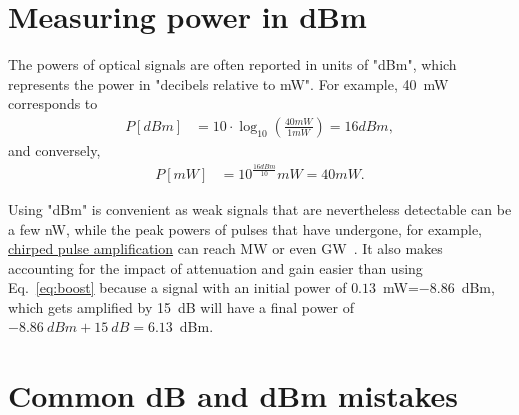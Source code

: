 \section{Measuring power in dBm}
The powers of optical signals are often reported in units of "dBm", which represents the power in "decibels relative to mW". For example, 40~mW corresponds to
\begin{align}
    P [dBm] &= 10\cdot\log_{10}\left(\frac{40mW}{1mW} \right)=16dBm,
\end{align}
and conversely,
\begin{align}
    \label{eq:dBm_rev}
    P [mW] &= 10^{\frac{16dBm}{10}}mW=40mW.
\end{align}


Using "dBm" is convenient as weak signals that are nevertheless detectable can be a few nW, while the peak powers of pulses that have undergone, for example, \href{https://youtu.be/Eh5CHRWFT-M}{chirped pulse amplification} can reach MW or even GW~\cite{Chirp_STRICKLAND_Nobel_prize}. It also makes accounting for the impact of attenuation and gain easier than using Eq.~\ref{eq:boost} because a signal with an initial power of $0.13$~mW=$-8.86$~dBm, which gets amplified by 15~dB will have a final power of $-8.86~dBm+15~dB=6.13$~dBm.    


\section{Common dB and dBm mistakes}

